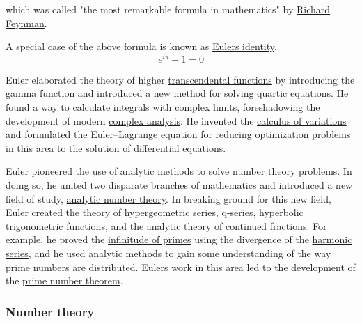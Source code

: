 which was called "the most remarkable formula in mathematics" by \href{https://en.wikipedia.org/wiki/Richard_Feynman}{Richard Feynman}.

A special case of the above formula is known as \href{https://en.wikipedia.org/wiki/Euler's_identity}{Euler\textquotesingle s identity},
{{\[e^{i\pi} + 1 = 0\]}{}}

Euler elaborated the theory of higher \href{https://en.wikipedia.org/wiki/Transcendental_function}{transcendental functions} by introducing the \href{https://en.wikipedia.org/wiki/Gamma_function}{gamma function} and introduced a new method for solving \href{https://en.wikipedia.org/wiki/Quartic_equation}{quartic equations}. He found a way to calculate integrals with complex limits, foreshadowing the development of modern \href{https://en.wikipedia.org/wiki/Complex_analysis}{complex analysis}. He invented the \href{https://en.wikipedia.org/wiki/Calculus_of_variations}{calculus of variations} and formulated the \href{https://en.wikipedia.org/wiki/Euler–Lagrange_equation}{Euler--Lagrange equation} for reducing \href{https://en.wikipedia.org/wiki/Mathematical_optimization}{optimization problems} in this area to the solution of \href{https://en.wikipedia.org/wiki/Differential_equation}{differential equations}.

Euler pioneered the use of analytic methods to solve number theory problems. In doing so, he united two disparate branches of mathematics and introduced a new field of study, \href{https://en.wikipedia.org/wiki/Analytic_number_theory}{analytic number theory}. In breaking ground for this new field, Euler created the theory of \href{https://en.wikipedia.org/wiki/Generalized_hypergeometric_series}{hypergeometric series}, \href{https://en.wikipedia.org/wiki/Q-series}{q-series}, \href{https://en.wikipedia.org/wiki/Hyperbolic_functions}{hyperbolic trigonometric functions}, and the analytic theory of \href{https://en.wikipedia.org/wiki/Generalized_continued_fraction}{continued fractions}. For example, he proved the \href{https://en.wikipedia.org/wiki/Infinitude_of_primes}{infinitude of primes} using the divergence of the \href{https://en.wikipedia.org/wiki/Harmonic_series_(mathematics)}{harmonic series}, and he used analytic methods to gain some understanding of the way \href{https://en.wikipedia.org/wiki/Prime_numbers}{prime numbers} are distributed. Euler\textquotesingle s work in this area led to the development of the \href{https://en.wikipedia.org/wiki/Prime_number_theorem}{prime number theorem}.


\subsubsection{Number theory}\label{Number_theory}

